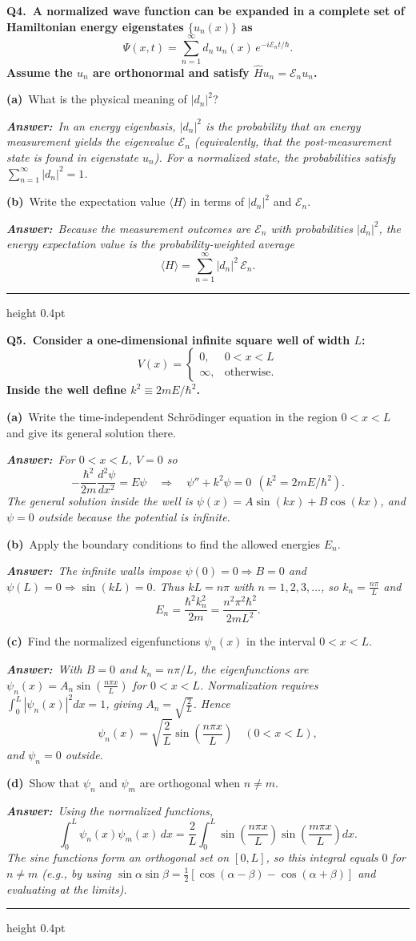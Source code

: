\documentclass[11pt]{article}
\newcommand{\QuestionStyle}[1]{{\large\bfseries\boldmath #1}}
\newcommand{\MPBlock}[3]{%
  \Needspace{8\baselineskip}%
  \noindent
  \begin{minipage}{\linewidth}
    \QuestionStyle{#1.~#2}

    \vspace{0.25em}
    #3

    \vspace{0.25em}
    \hrule height 0.4pt
  \end{minipage}
  \vspace{0.75em}
}
\newcommand{\OEPart}[3]{%
  \par\vspace{0.35em}
  \noindent\textbf{(#1)}~#2
  \par\vspace{0.15em}
  \noindent\textit{\textbf{Answer:}~#3}
  \par
}
\begin{document}
\MPBlock{Q4}{A normalized wave function can be expanded in a complete set of Hamiltonian energy eigenstates \(\{u_n(x)\}\) as
\[
\Psi(x,t)=\sum_{n=1}^{\infty} d_n\,u_n(x)\,e^{-i\mathcal{E}_n t/\hbar}.
\]
Assume the \(u_n\) are orthonormal and satisfy \(\hat H u_n=\mathcal{E}_n u_n\).}{
  \OEPart{a}{What is the physical meaning of \(|d_n|^2\)?}{In an energy eigenbasis, \(|d_n|^2\) is the probability that an energy measurement yields the eigenvalue \(\mathcal{E}_n\) (equivalently, that the post-measurement state is found in eigenstate \(u_n\)). For a normalized state, the probabilities satisfy \(\sum_{n=1}^{\infty}|d_n|^2=1\).}
  \OEPart{b}{Write the expectation value \(\langle H\rangle\) in terms of \(|d_n|^2\) and \(\mathcal{E}_n\).}{Because the measurement outcomes are \(\mathcal{E}_n\) with probabilities \(|d_n|^2\), the energy expectation value is the probability-weighted average
\[\langle H\rangle=\sum_{n=1}^{\infty}|d_n|^2\,\mathcal{E}_n.\]}
}

\MPBlock{Q5}{Consider a one-dimensional infinite square well of width \(L\):
\[
V(x)=\begin{cases}
0, & 0<x<L\\
\infty, & \text{otherwise.}
\end{cases}
\]
Inside the well define \(k^2\equiv 2mE/\hbar^2\).}{
  \OEPart{a}{Write the time-independent Schr\"odinger equation in the region \(0<x<L\) and give its general solution there.}{For \(0<x<L\), \(V=0\) so
\[-\frac{\hbar^2}{2m}\frac{d^2\psi}{dx^2}=E\psi \quad\Rightarrow\quad \psi''+k^2\psi=0\ \ (k^2=2mE/\hbar^2).\]
The general solution inside the well is \(\psi(x)=A\sin(kx)+B\cos(kx)\), and \(\psi=0\) outside because the potential is infinite.}
  \OEPart{b}{Apply the boundary conditions to find the allowed energies \(E_n\).}{The infinite walls impose \(\psi(0)=0\Rightarrow B=0\) and \(\psi(L)=0\Rightarrow \sin(kL)=0\). Thus \(kL=n\pi\) with \(n=1,2,3,\dots\), so \(k_n=\frac{n\pi}{L}\) and
\[E_n=\frac{\hbar^2 k_n^2}{2m}=\frac{n^2\pi^2\hbar^2}{2mL^2}.\]}
  \OEPart{c}{Find the normalized eigenfunctions \(\psi_n(x)\) in the interval \(0<x<L\).}{With \(B=0\) and \(k_n=n\pi/L\), the eigenfunctions are \(\psi_n(x)=A_n\sin\left(\frac{n\pi x}{L}\right)\) for \(0<x<L\). Normalization requires \(\int_0^L |\psi_n(x)|^2dx=1\), giving \(A_n=\sqrt{\frac{2}{L}}\). Hence
\[\psi_n(x)=\sqrt{\frac{2}{L}}\sin\left(\frac{n\pi x}{L}\right)\quad (0<x<L),\]
and \(\psi_n=0\) outside.}
  \OEPart{d}{Show that \(\psi_n\) and \(\psi_m\) are orthogonal when \(n\ne m\).}{Using the normalized functions,
\[\int_0^L \psi_n(x)\psi_m(x)\,dx=\frac{2}{L}\int_0^L \sin\left(\frac{n\pi x}{L}\right)\sin\left(\frac{m\pi x}{L}\right)dx.\]
The sine functions form an orthogonal set on \([0,L]\), so this integral equals \(0\) for \(n\ne m\) (e.g., by using \(\sin\alpha\sin\beta=\tfrac12[\cos(\alpha-\beta)-\cos(\alpha+\beta)]\) and evaluating at the limits).}
}
\end{document}
